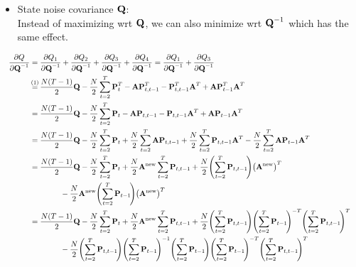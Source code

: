 	\begin{itemize}
		\item State noise covariance \(\boldsymbol{\mathrm{Q}}\): \\ Instead of maximizing \ac{wrt} \(\boldsymbol{\mathrm{Q}}\), we can also minimize \ac{wrt} \(\boldsymbol{\mathrm{Q}}^{-1}\) which has the same effect.
	\end{itemize}
	\begin{align}
		&&\pdv{Q}{\mat{Q}^{-1}}
			&= \pdv{Q_1}{\mat{Q}^{-1}} + \pdv{Q_2}{\mat{Q}^{-1}} + \pdv{Q_3}{\mat{Q}^{-1}} + \pdv{Q_4}{\mat{Q}^{-1}} = \pdv{Q_1}{\mat{Q}^{-1}} + \pdv{Q_3}{\mat{Q}^{-1}} & \nonumber \\
		&&	&\oversetfootnotemark{=} \frac{N(T - 1)}{2} \mat{Q} - \frac{N}{2} \sum_{t = 2}^{T} \mat{P}_t^T - \mat{A} \mat{P}_{t, t - 1}^T - \mat{P}_{t, t - 1}^T \mat{A}^T + \mat{A} \mat{P}_{t - 1}^T \mat{A}^T & \nonumber \\
		&&	&= \frac{N(T - 1)}{2} \mat{Q} - \frac{N}{2} \sum_{t = 2}^{T} \mat{P}_t - \mat{A} \mat{P}_{t, t - 1} - \mat{P}_{t, t - 1} \mat{A}^T + \mat{A} \mat{P}_{t - 1} \mat{A}^T & \nonumber \\
		&&	&= \frac{N(T - 1)}{2} \mat{Q} - \frac{N}{2} \sum_{t = 2}^{T} \mat{P}_t + \frac{N}{2} \sum_{t = 2}^{T} \mat{A} \mat{P}_{t, t - 1} + \frac{N}{2} \sum_{t = 2}^{T} \mat{P}_{t, t - 1} \mat{A}^T - \frac{N}{2} \sum_{t = 2}^{T} \mat{A} \mat{P}_{t - 1} \mat{A}^T & \nonumber \\
		&&	&= \frac{N(T - 1)}{2} \mat{Q} - \frac{N}{2} \sum_{t = 2}^{T} \mat{P}_t + \frac{N}{2} \mat{A}^\new \sum_{t = 2}^{T} \mat{P}_{t, t - 1} + \frac{N}{2} \Bigg(\! \sum_{t = 2}^{T} \mat{P}_{t, t - 1} \!\Bigg) \big(\mat{A}^\new\big)^T & \nonumber \\
			&&	&\qquad\qquad - \frac{N}{2} \mat{A}^\new \Bigg(\! \sum_{t = 2}^{T} \mat{P}_{t - 1} \!\Bigg) \big(\mat{A}^\new\big)^T & \nonumber \\
		&&	&= \frac{N(T - 1)}{2} \mat{Q} - \frac{N}{2} \sum_{t = 2}^{T} \mat{P}_t + \frac{N}{2} \mat{A}^\new \sum_{t = 2}^{T} \mat{P}_{t, t - 1} + \frac{N}{2} \Bigg(\! \sum_{t = 2}^{T} \mat{P}_{t, t - 1} \!\Bigg) \Bigg(\! \sum_{t = 2}^{T} \mat{P}_{t - 1} \!\Bigg)^{-T} \Bigg(\! \sum_{t = 2}^{T} \mat{P}_{t, t - 1} \!\Bigg)^T & \nonumber \\
			&&	&\qquad\qquad - \frac{N}{2} \Bigg(\! \sum_{t = 2}^{T} \mat{P}_{t, t - 1} \!\Bigg) \Bigg(\! \sum_{t = 2}^{T} \mat{P}_{t - 1} \!\Bigg)^{-1} \Bigg(\! \sum_{t = 2}^{T} \mat{P}_{t - 1} \!\Bigg) \Bigg(\! \sum_{t = 2}^{T} \mat{P}_{t - 1} \!\Bigg)^{-T} \Bigg(\! \sum_{t = 2}^{T} \mat{P}_{t, t - 1} \!\Bigg)^T & \nonumber \\

\end{align}
